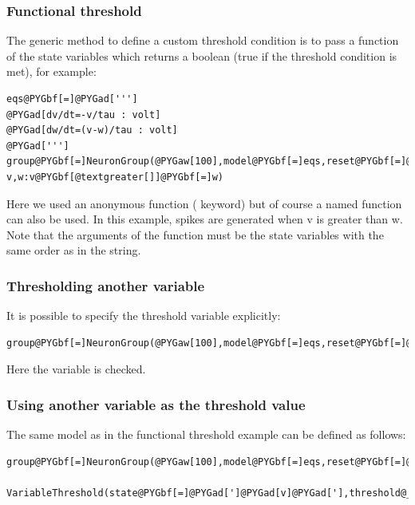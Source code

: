 \documentclass[letterpaper,10pt,english]{manual}
\begin{document}
\subsubsection{Functional threshold}

The generic method to define a custom threshold condition is to pass a function of the
state variables which returns a boolean (true if the threshold condition is met), for example:

\begin{Verbatim}[commandchars=@\[\]]
eqs@PYGbf[=]@PYGad[''']
@PYGad[dv/dt=-v/tau : volt]
@PYGad[dw/dt=(v-w)/tau : volt]
@PYGad[''']
group@PYGbf[=]NeuronGroup(@PYGaw[100],model@PYGbf[=]eqs,reset@PYGbf[=]@PYGaw[0]@PYGbf[*]mV,threshold@PYGbf[=]@PYGay[lambda] v,w:v@PYGbf[@textgreater[]]@PYGbf[=]w)
\end{Verbatim}

Here we used an anonymous function ( keyword) but of course a named function can also
be used. In this example, spikes are generated when v is greater than w.
Note that the arguments of the function must be the state variables with the same order as
in the \hyperlink{brian.Equations}{} string.


\subsubsection{Thresholding another variable}

It is possible to specify the threshold variable explicitly:

\begin{Verbatim}[commandchars=@\[\]]
group@PYGbf[=]NeuronGroup(@PYGaw[100],model@PYGbf[=]eqs,reset@PYGbf[=]@PYGaw[0]@PYGbf[*]mV,threshold@PYGbf[=]Threshold(@PYGaw[0]@PYGbf[*]mV,state@PYGbf[=]@PYGad[']@PYGad[w]@PYGad[']))
\end{Verbatim}

Here the variable  is checked.


\subsubsection{Using another variable as the threshold value}

The same model as in the functional threshold example can be defined as follows:

\begin{Verbatim}[commandchars=@\[\]]
group@PYGbf[=]NeuronGroup(@PYGaw[100],model@PYGbf[=]eqs,reset@PYGbf[=]@PYGaw[0]@PYGbf[*]mV,threshold@PYGbf[=]\
      VariableThreshold(state@PYGbf[=]@PYGad[']@PYGad[v]@PYGad['],threshold@_state@PYGbf[=]@PYGad[']@PYGad[w]@PYGad[']))
\end{Verbatim}
\end{document}

